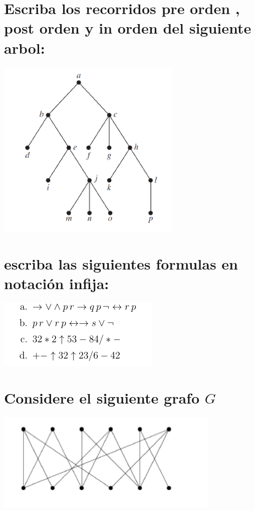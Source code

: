 \documentclass[10pt,a4paper]{article} %
\begin{document}




        \section{Escriba los recorridos pre orden , post orden y in orden del siguiente arbol:}
            \begin{center}
                \includegraphics[width=0.4\linewidth]{arbolp13.png}
            \end{center}





        \section{escriba las siguientes formulas en notación infija:}
            \begin{center}
                \includegraphics[width=0.5\linewidth]{form14.png}
            \end{center}




        \section{Considere el siguiente grafo $G$}
            \begin{center}
                \includegraphics[width=0.4\linewidth]{ultimografo.png}
            \end{center}
\end{document}
